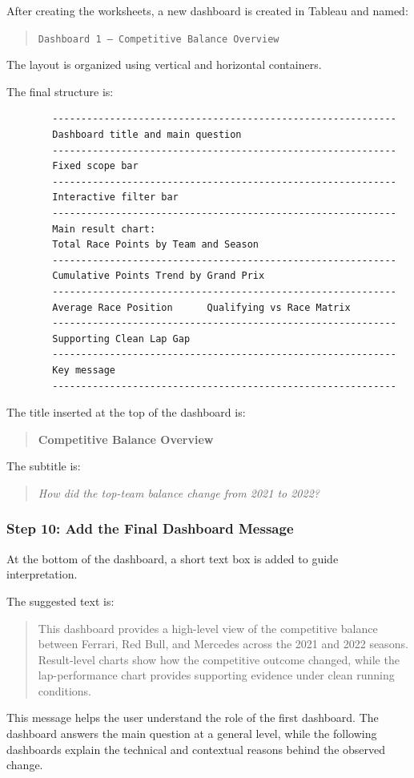 \documentclass[12pt,a4paper]{article}
\begin{document}
	After creating the worksheets, a new dashboard is created in Tableau and named:
	
	\begin{quote}
		\texttt{Dashboard 1 -- Competitive Balance Overview}
	\end{quote}
	
	The layout is organized using vertical and horizontal containers.
	
	The final structure is:
	
	\begin{verbatim}
		------------------------------------------------------------
		Dashboard title and main question
		------------------------------------------------------------
		Fixed scope bar
		------------------------------------------------------------
		Interactive filter bar
		------------------------------------------------------------
		Main result chart:
		Total Race Points by Team and Season
		------------------------------------------------------------
		Cumulative Points Trend by Grand Prix
		------------------------------------------------------------
		Average Race Position      Qualifying vs Race Matrix
		------------------------------------------------------------
		Supporting Clean Lap Gap
		------------------------------------------------------------
		Key message
		------------------------------------------------------------
	\end{verbatim}
	
	The title inserted at the top of the dashboard is:
	
	\begin{quote}
		\textbf{Competitive Balance Overview}
	\end{quote}
	
	The subtitle is:
	
	\begin{quote}
		\textit{How did the top-team balance change from 2021 to 2022?}
	\end{quote}
	
	\subsubsection{Step 10: Add the Final Dashboard Message}
	
	At the bottom of the dashboard, a short text box is added to guide interpretation.
	
	The suggested text is:
	
	\begin{quote}
		This dashboard provides a high-level view of the competitive balance between Ferrari, Red Bull, and Mercedes across the 2021 and 2022 seasons. Result-level charts show how the competitive outcome changed, while the lap-performance chart provides supporting evidence under clean running conditions.
	\end{quote}
	
	This message helps the user understand the role of the first dashboard.
	The dashboard answers the main question at a general level, while the following dashboards explain the technical and contextual reasons behind the observed change.
	
\end{document}
